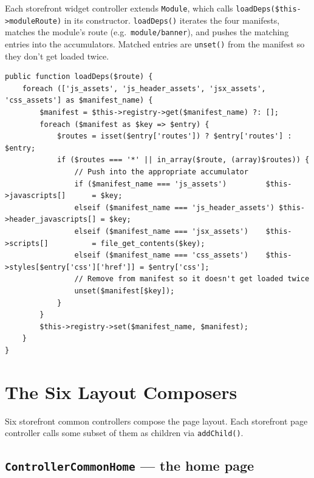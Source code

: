\documentclass[11pt,a4paper]{article}
\begin{document}
Each storefront widget controller extends \texttt{Module}, which
calls \texttt{loadDeps(\$this->moduleRoute)} in its constructor.
\texttt{loadDeps()} iterates the four manifests, matches the
module's route (e.g.\ \texttt{module/banner}), and pushes the
matching entries into the accumulators. Matched entries are
\texttt{unset()} from the manifest so they don't get loaded
twice.

\begin{lstlisting}[caption={\texttt{Module::loadDeps()} --- the module asset loader (abridged).},label={lst:loaddeps}]
public function loadDeps($route) {
    foreach (['js_assets', 'js_header_assets', 'jsx_assets', 'css_assets'] as $manifest_name) {
        $manifest = $this->registry->get($manifest_name) ?: [];
        foreach ($manifest as $key => $entry) {
            $routes = isset($entry['routes']) ? $entry['routes'] : $entry;
            if ($routes === '*' || in_array($route, (array)$routes)) {
                // Push into the appropriate accumulator
                if ($manifest_name === 'js_assets')         $this->javascripts[]      = $key;
                elseif ($manifest_name === 'js_header_assets') $this->header_javascripts[] = $key;
                elseif ($manifest_name === 'jsx_assets')    $this->scripts[]          = file_get_contents($key);
                elseif ($manifest_name === 'css_assets')    $this->styles[$entry['css']['href']] = $entry['css'];
                // Remove from manifest so it doesn't get loaded twice
                unset($manifest[$key]);
            }
        }
        $this->registry->set($manifest_name, $manifest);
    }
}
\end{lstlisting}

\section{The Six Layout Composers}\label{sec:layout-composers}

Six storefront common controllers compose the page layout. Each
storefront page controller calls some subset of them as children
via \texttt{addChild()}.

\subsection{\texttt{ControllerCommonHome} --- the home page}
\end{document}
